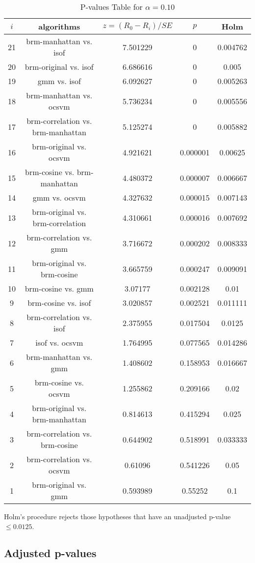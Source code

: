 \documentclass[a4paper,10pt]{article}
\begin{document}
\begin{landscape}
\begin{table}[!htp]
\centering\scriptsize
\begin{tabular}{ccccc}
$i$&algorithms&$z=(R_0 - R_i)/SE$&$p$&Holm\\
\hline21&brm-manhattan vs. isof&7.501229&0&0.004762\\
20&brm-original vs. isof&6.686616&0&0.005\\
19&gmm vs. isof&6.092627&0&0.005263\\
18&brm-manhattan vs. ocsvm&5.736234&0&0.005556\\
17&brm-correlation vs. brm-manhattan&5.125274&0&0.005882\\
16&brm-original vs. ocsvm&4.921621&0.000001&0.00625\\
15&brm-cosine vs. brm-manhattan&4.480372&0.000007&0.006667\\
14&gmm vs. ocsvm&4.327632&0.000015&0.007143\\
13&brm-original vs. brm-correlation&4.310661&0.000016&0.007692\\
12&brm-correlation vs. gmm&3.716672&0.000202&0.008333\\
11&brm-original vs. brm-cosine&3.665759&0.000247&0.009091\\
10&brm-cosine vs. gmm&3.07177&0.002128&0.01\\
9&brm-cosine vs. isof&3.020857&0.002521&0.011111\\
8&brm-correlation vs. isof&2.375955&0.017504&0.0125\\
7&isof vs. ocsvm&1.764995&0.077565&0.014286\\
6&brm-manhattan vs. gmm&1.408602&0.158953&0.016667\\
5&brm-cosine vs. ocsvm&1.255862&0.209166&0.02\\
4&brm-original vs. brm-manhattan&0.814613&0.415294&0.025\\
3&brm-correlation vs. brm-cosine&0.644902&0.518991&0.033333\\
2&brm-correlation vs. ocsvm&0.61096&0.541226&0.05\\
1&brm-original vs. gmm&0.593989&0.55252&0.1\\
\hline
\end{tabular}
\caption{P-values Table for $\alpha=0.10$}
\end{table}Holm's procedure rejects those hypotheses that have an unadjusted p-value $\le0.0125$.

\pagebreak

\subsection{Adjusted p-values}


\end{landscape}
\end{document}
